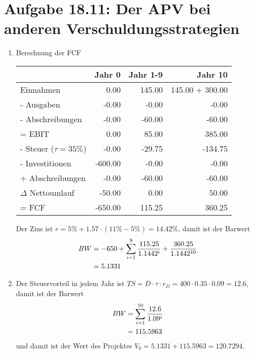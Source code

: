 \documentclass{article}
\begin{document}
	\section*{Aufgabe 18.11: Der APV bei anderen Verschuldungsstrategien}
	\begin{enumerate}[label=(\alph*)]
		\item Berechnung der FCF
		\begin{center}
			\begin{tabular}{l|r|r|r}
				& \textbf{Jahr 0} & \textbf{Jahr 1-9} & \textbf{Jahr 10} \\
				\hline
				Einnahmen & 0.00 & 145.00 & 145.00 + 300.00 \\
				- Ausgaben & -0.00 & -0.00 & -0.00 \\
				- Abschreibungen & -0.00 & -60.00 & -60.00 \\
				\hline
				= EBIT & 0.00 & 85.00 & 385.00 \\
				- Steuer ($\tau=35\%$) & -0.00 & -29.75 & -134.75 \\
				- Investitionen & -600.00 & -0.00 & -0.00 \\
				 + Abschreibungen & -0.00 & -60.00 & -60.00 \\
				 $\Delta$ Nettoumlauf & -50.00 & 0.00 & 50.00 \\
				 \hline
				 = FCF & -650.00 & 115.25 & 360.25
			\end{tabular}
		\end{center}
		Der Zins ist $r=5\% + 1.57\cdot (11\%-5\%)=14.42\%$, damit ist der Barwert
		\begin{align}
			BW &= -650 + \sum_{i=1}^{9}\frac{115.25}{1.1442^i} + \frac{360.25}{1.1442^{10}} \notag \\
			&= 5.1331 \notag
		\end{align}
		\item Der Steuervorteil in jedem Jahr ist $TS=D\cdot \tau\cdot r_D=400\cdot 0.35\cdot 0.09=12.6$, damit ist der Barwert
		\begin{align}
			BW &= \sum_{i=1}^{10} \frac{12.6}{1.09^i} \notag \\
			&= 115.5963 \notag
		\end{align}
		und damit ist der Wert des Projektes $V_0=5.1331 + 115.5963=120.7294$.
	\end{enumerate}
\end{document}
